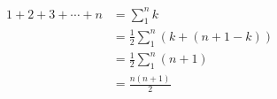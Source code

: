 \documentclass{oblivoir}
\begin{document}
	\begin{align}
	1+2+3+\cdots+n &= \sum_{1}^{n}k \nonumber\\
	&= \frac{1}{2}\sum_{1}^{n} (k+(n+1-k)) 
	\nonumber\\
	&= \frac{1}{2}\sum_{1}^{n} (n+1) \nonumber\\
	&= \frac{n(n+1)}{2}
	\end{align}
\end{document}
